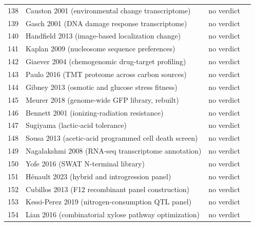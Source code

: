 \begin{longtable}{@{}r L{88mm} L{40mm} L{24mm}@{}}
138 & Causton 2001 (environmental change transcriptome) & no verdict &  \\
139 & Gasch 2001 (DNA damage response transcriptome) & no verdict &  \\
140 & Handfield 2013 (image-based localization change) & no verdict &  \\
141 & Kaplan 2009 (nucleosome sequence preferences) & no verdict &  \\
142 & Giaever 2004 (chemogenomic drug-target profiling) & no verdict &  \\
143 & Paulo 2016 (TMT proteome across carbon sources) & no verdict &  \\
144 & Gibney 2013 (osmotic and glucose stress fitness) & no verdict &  \\
145 & Meurer 2018 (genome-wide GFP library, rebuilt) & no verdict &  \\
146 & Bennett 2001 (ionizing-radiation resistance) & no verdict &  \\
147 & Sugiyama (lactic-acid tolerance) & no verdict &  \\
148 & Sousa 2013 (acetic-acid programmed cell death screen) & no verdict &  \\
149 & Nagalakshmi 2008 (RNA-seq transcriptome annotation) & no verdict &  \\
150 & Yofe 2016 (SWAT N-terminal library) & no verdict &  \\
151 & Hénault 2023 (hybrid and introgression panel) & no verdict &  \\
152 & Cubillos 2013 (F12 recombinant panel construction) & no verdict &  \\
153 & Kessi-Perez 2019 (nitrogen-consumption QTL panel) & no verdict &  \\
154 & Lian 2016 (combinatorial xylose pathway optimization) & no verdict &  \\
\end{longtable}
\endgroup
